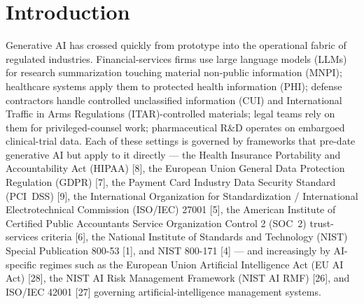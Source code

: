 \documentclass[11pt]{article}
\begin{document}
\begin{abstract}
\texttt{skill-formal-bmc.mjs}, \texttt{skill-formal-bundle.mjs}) plus
a command-line interface (CLI) at
\texttt{scripts/skills-formal-verify.mjs} produces a signed
proof-carrying bundle the runtime can re-check at load time, raising a
skill from \texttt{tested} to \texttt{formal} via composable static
effect-containment, refinement-typed dispatch, and bounded model
checking against the runtime biconditional. The unit-test inventory
correspondingly grows from 208 to 261 unit tests; together with the
95 adversarial pen-tests this is a 356-case suite.
\textbf{enclawed is a hardening framework,
not an accredited compliance certification.} The deploying organization
remains responsible for hardware, validated cryptographic modules,
certified facilities, and assessor sign-off.
\end{abstract}

\section{Introduction}

Generative AI has crossed quickly from prototype into the operational
fabric of regulated industries. Financial-services firms use large
language models (LLMs) for research summarization touching material
non-public information (MNPI); healthcare systems apply them to
protected health information (PHI); defense contractors handle
controlled unclassified information (CUI) and International Traffic in
Arms Regulations (ITAR)-controlled materials; legal teams rely on
them for privileged-counsel work; pharmaceutical R\&D operates on
embargoed clinical-trial data. Each of these settings is governed by
frameworks that pre-date generative AI but apply to it directly --- the
Health Insurance Portability and Accountability Act (HIPAA) [8], the
European Union General Data Protection Regulation (GDPR) [7], the
Payment Card Industry Data Security Standard (PCI~DSS) [9], the
International Organization for Standardization / International
Electrotechnical Commission (ISO/IEC) 27001 [5], the American Institute
of Certified Public Accountants Service Organization Control 2 (SOC~2)
trust-services criteria [6], the National Institute of Standards and
Technology (NIST) Special Publication 800-53 [1], and NIST 800-171 [4]
--- and increasingly by AI-specific regimes such as the European Union
Artificial Intelligence Act (EU AI Act) [28], the NIST AI Risk
Management Framework (NIST AI RMF) [26], and ISO/IEC 42001 [27]
governing artificial-intelligence management systems.
\end{document}
